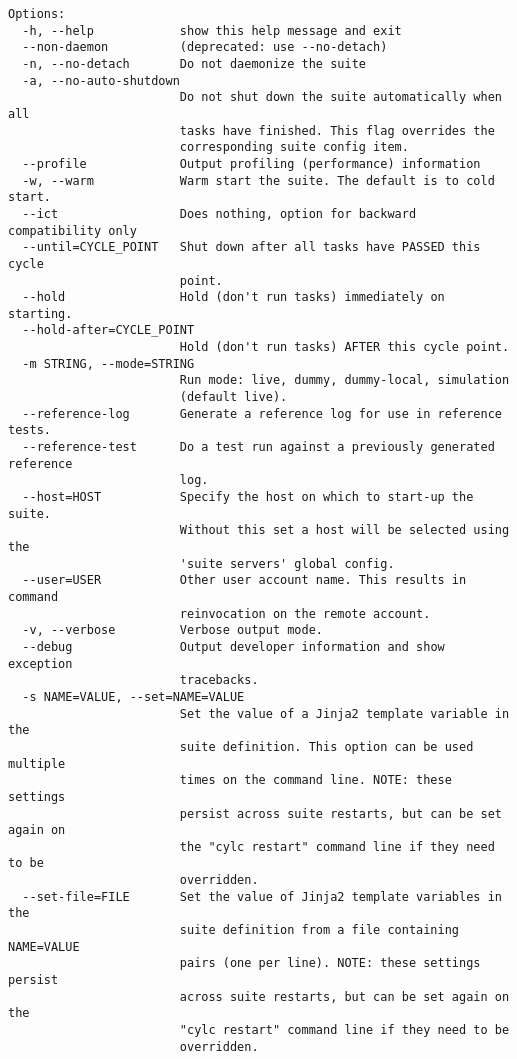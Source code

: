 \begin{lstlisting}
Options:
  -h, --help            show this help message and exit
  --non-daemon          (deprecated: use --no-detach)
  -n, --no-detach       Do not daemonize the suite
  -a, --no-auto-shutdown
                        Do not shut down the suite automatically when all
                        tasks have finished. This flag overrides the
                        corresponding suite config item.
  --profile             Output profiling (performance) information
  -w, --warm            Warm start the suite. The default is to cold start.
  --ict                 Does nothing, option for backward compatibility only
  --until=CYCLE_POINT   Shut down after all tasks have PASSED this cycle
                        point.
  --hold                Hold (don't run tasks) immediately on starting.
  --hold-after=CYCLE_POINT
                        Hold (don't run tasks) AFTER this cycle point.
  -m STRING, --mode=STRING
                        Run mode: live, dummy, dummy-local, simulation
                        (default live).
  --reference-log       Generate a reference log for use in reference tests.
  --reference-test      Do a test run against a previously generated reference
                        log.
  --host=HOST           Specify the host on which to start-up the suite.
                        Without this set a host will be selected using the
                        'suite servers' global config.
  --user=USER           Other user account name. This results in command
                        reinvocation on the remote account.
  -v, --verbose         Verbose output mode.
  --debug               Output developer information and show exception
                        tracebacks.
  -s NAME=VALUE, --set=NAME=VALUE
                        Set the value of a Jinja2 template variable in the
                        suite definition. This option can be used multiple
                        times on the command line. NOTE: these settings
                        persist across suite restarts, but can be set again on
                        the "cylc restart" command line if they need to be
                        overridden.
  --set-file=FILE       Set the value of Jinja2 template variables in the
                        suite definition from a file containing NAME=VALUE
                        pairs (one per line). NOTE: these settings persist
                        across suite restarts, but can be set again on the
                        "cylc restart" command line if they need to be
                        overridden.
\end{lstlisting}
